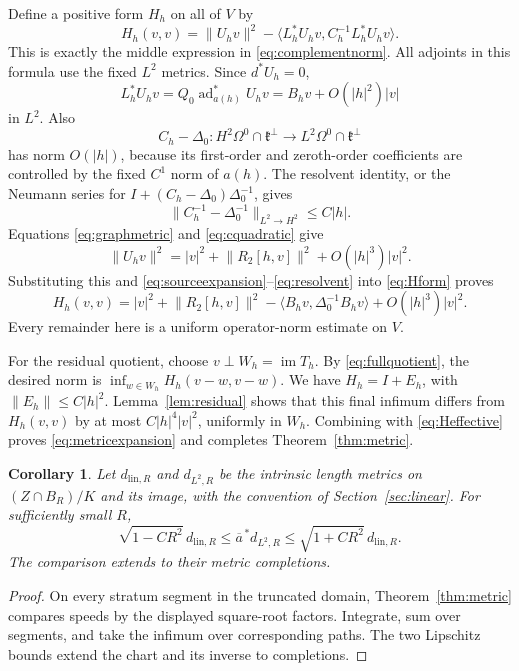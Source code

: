 \documentclass[11pt]{amsart}
\newtheorem{corollary}[theorem]{Corollary}
\theoremstyle{definition}
\theoremstyle{remark}
\newcommand{\kk}{\mathfrak k}
\newcommand{\ad}{\operatorname{ad}}
\newcommand{\im}{\operatorname{im}}
\newcommand{\ip}[2]{\langle #1,#2\rangle}
\newcommand{\norm}[1]{\lVert #1\rVert}
\begin{document}
Define a positive form $H_h$ on all of $V$ by
\begin{equation}\label{eq:Hform}
 H_h(v,v)=\norm{U_hv}^2
   -\ip{L_h^*U_hv}{C_h^{-1}L_h^*U_hv}.
\end{equation}
This is exactly the middle expression in
\eqref{eq:complementnorm}. All adjoints in this formula use the fixed
$L^2$ metrics. Since $d^*U_h=0$,
\begin{equation}\label{eq:sourceexpansion}
 L_h^*U_hv=Q_0\ad_{a(h)}^*U_hv
          =B_hv+O(|h|^2)|v|
\end{equation}
in $L^2$. Also
\[
 C_h-\Delta_0:
 H^2\Omega^0\cap\kk^\perp\longrightarrow
 L^2\Omega^0\cap\kk^\perp
\]
has norm $O(|h|)$, because its first-order and zeroth-order
coefficients are controlled by the fixed $C^1$ norm of $a(h)$.
The resolvent identity, or the Neumann series for
$I+(C_h-\Delta_0)\Delta_0^{-1}$, gives
\begin{equation}\label{eq:resolvent}
 \norm{C_h^{-1}-\Delta_0^{-1}}_{L^2\to H^2}\leq C|h|.
\end{equation}
Equations \eqref{eq:graphmetric} and \eqref{eq:cquadratic} give
\[
 \norm{U_hv}^2
 =|v|^2+\norm{R_2[h,v]}^2+O(|h|^3)|v|^2.
\]
Substituting this and \eqref{eq:sourceexpansion}--\eqref{eq:resolvent}
into \eqref{eq:Hform} proves
\begin{equation}\label{eq:Heffective}
 H_h(v,v)=|v|^2+\norm{R_2[h,v]}^2
     -\ip{B_hv}{\Delta_0^{-1}B_hv}+O(|h|^3)|v|^2.
\end{equation}
Every remainder here is a uniform operator-norm estimate on $V$.

For the residual quotient, choose $v\perp W_h=\im T_h$. By
\eqref{eq:fullquotient}, the desired norm is
$\inf_{w\in W_h}H_h(v-w,v-w)$. We have
$H_h=I+E_h$, with $\norm{E_h}\leq C|h|^2$.
Lemma~\ref{lem:residual} shows that this final infimum differs from
$H_h(v,v)$ by at most $C|h|^4|v|^2$, uniformly in $W_h$.
Combining with \eqref{eq:Heffective} proves
\eqref{eq:metricexpansion} and completes Theorem~\ref{thm:metric}.

\begin{corollary}\label{cor:length}
Let $d_{\mathrm{lin},R}$ and $d_{L^2,R}$ be the intrinsic length
metrics on $(Z\cap B_R)/K$ and its image, with the convention of
Section~\ref{sec:linear}. For sufficiently small $R$,
\[
 \sqrt{1-CR^2}\,d_{\mathrm{lin},R}
 \leq\overline a^{\,*}d_{L^2,R}
 \leq\sqrt{1+CR^2}\,d_{\mathrm{lin},R}.
\]
The comparison extends to their metric completions.
\end{corollary}
\begin{proof}
On every stratum segment in the truncated domain, Theorem~\ref{thm:metric}
compares speeds by the displayed square-root factors. Integrate,
sum over segments, and take the infimum over corresponding paths.
The two Lipschitz bounds extend the chart and its inverse to
completions.
\end{proof}
\end{document}

